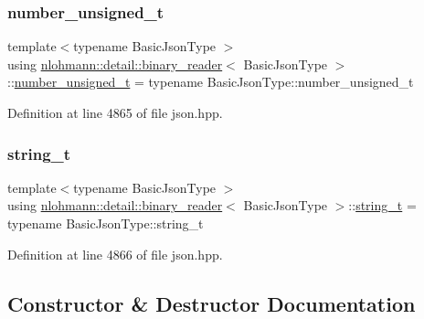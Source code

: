 \subsubsection{\texorpdfstring{number\+\_\+unsigned\+\_\+t}{number\_unsigned\_t}}
{\footnotesize\ttfamily template$<$typename Basic\+Json\+Type $>$ \\
using \hyperlink{classnlohmann_1_1detail_1_1binary__reader}{nlohmann\+::detail\+::binary\+\_\+reader}$<$ Basic\+Json\+Type $>$\+::\hyperlink{classnlohmann_1_1detail_1_1binary__reader_a6e87a28ccbfdb4afcc2c93df9f9dbe74}{number\+\_\+unsigned\+\_\+t} =  typename Basic\+Json\+Type\+::number\+\_\+unsigned\+\_\+t\hspace{0.3cm}{\ttfamily [private]}}



Definition at line 4865 of file json.\+hpp.

\mbox{\label{classnlohmann_1_1detail_1_1binary__reader_a889a8702ca8aa45e99136bc31ea898e9}} 
\subsubsection{\texorpdfstring{string\+\_\+t}{string\_t}}
{\footnotesize\ttfamily template$<$typename Basic\+Json\+Type $>$ \\
using \hyperlink{classnlohmann_1_1detail_1_1binary__reader}{nlohmann\+::detail\+::binary\+\_\+reader}$<$ Basic\+Json\+Type $>$\+::\hyperlink{classnlohmann_1_1detail_1_1binary__reader_a889a8702ca8aa45e99136bc31ea898e9}{string\+\_\+t} =  typename Basic\+Json\+Type\+::string\+\_\+t\hspace{0.3cm}{\ttfamily [private]}}



Definition at line 4866 of file json.\+hpp.



\subsection{Constructor \& Destructor Documentation}
\mbox{\label{classnlohmann_1_1detail_1_1binary__reader_a7e643baadaf4c31718cd74833bdd542f}} 

